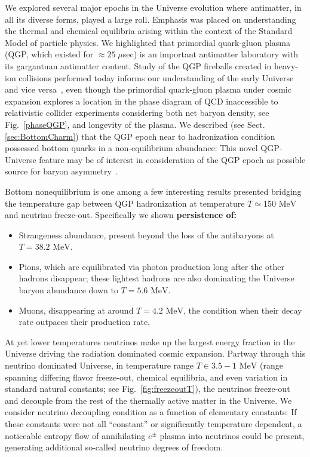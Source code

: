 \documentclass[universe,article,submit,moreauthors,pdftex,a4paper]{Definitions/mdpi}
\newcommand{\MeV}{\text{ MeV}}
\newcommand*{\rf}[1]{Fig.~{\ref{#1}}}
\newcommand*{\rsec}[1]{Sect.\,{\ref{#1}}}
\begin{document}
We explored several major epochs in the Universe evolution where antimatter, in all its diverse forms, played a large roll. Emphasis was placed on understanding the thermal and chemical equilibria arising within the context of the Standard Model of particle physics. We highlighted that primordial quark-gluon plasma (QGP, which existed for $\approx 25\;\mu$sec) is an important antimatter laboratory with its gargantuan antimatter content. Study of the QGP fireballs created in heavy-ion collisions performed today informs our understanding of the early Universe and vice versa~\cite{Borsanyi:2016ksw,Rafelski:2013qeu,Petran:2013lja,Philipsen:2012nu}, even though the primordial quark-gluon plasma under cosmic expansion explores a location in the phase diagram of QCD inaccessible to relativistic collider experiments considering both net baryon density, see \rf{phaseQGP}, and longevity of the plasma. We described (see \rsec{sec:BottomCharm}) that the QGP epoch near to hadronization condition possessed bottom quarks in a non-equilibrium abundance: This novel QGP-Universe feature may be of interest in consideration of the QGP epoch as possible source for baryon asymmetry~\cite{Yang:2020nne,Yang:2023bot}. 

Bottom nonequilibrium is one among a few interesting results presented bridging the temperature gap between QGP hadronization at temperature $T\simeq150\MeV$ and neutrino freeze-out. Specifically we shown {\bf persistence of:}
 \begin{itemize}
 \item Strangeness abundance, present beyond the loss of the antibaryons at $T=38.2\MeV$.
 \item Pions, which are equilibrated via photon production long after the other hadrons disappear; these lightest hadrons are also dominating the Universe baryon abundance down to $T=5.6\MeV$.
 \item Muons, disappearing at around $T=4.2\MeV$, the condition when their decay rate outpaces their production rate.
 \end{itemize}

At yet lower temperatures neutrinos make up the largest energy fraction in the Universe driving the radiation dominated cosmic expansion. Partway through this neutrino dominated Universe, in temperature  range $T\in 3.5-1\MeV$ (range spanning differing flavor freeze-out, chemical equilibria, and even variation in  standard natural constants; see \rf{fig:freezeoutT}), the neutrinos freeze-out and decouple from the rest of the thermally active matter in the Universe. We consider neutrino decoupling condition as a function of elementary constants: If these constants were not all ``constant'' or significantly temperature dependent, a noticeable entropy flow of annihilating $e^{\pm}$ plasma into neutrinos could be present, generating additional so-called neutrino degrees of freedom.
\end{document}
